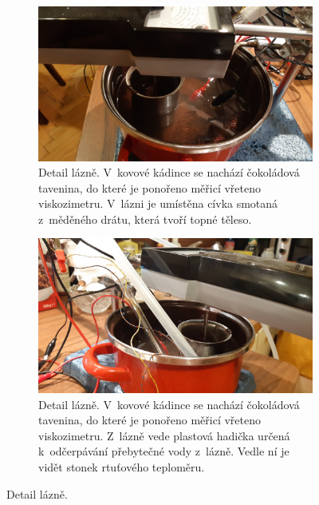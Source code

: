 \documentclass[12pt]{article}
\begin{document}
\begin{figure}[h!]
    \begin{subfigure}[b]{\textwidth}
        \includegraphics[width = \textwidth]{prilohy/lázeň_1.jpg}
        \caption{Detail lázně. V~kovové kádince se nachází čokoládová tavenina, do které je ponořeno měřicí vřeteno viskozimetru. V~lázni je umístěna cívka smotaná z~měděného drátu, která tvoří topné těleso.}
    \end{subfigure}
    \hfill
    \begin{subfigure}[b]{\textwidth}
        \includegraphics[width = \textwidth]{prilohy/lázeň_2.jpg}
        \caption{Detail lázně. V~kovové kádince se nachází čokoládová tavenina, do které je ponořeno měřicí vřeteno viskozimetru. Z~lázně vede plastová hadička určená k~odčerpávání přebytečné vody z~lázně. Vedle ní je vidět stonek rtuťového teploměru.}
    \end{subfigure}
    \caption{Detail lázně.}
    \label{fig:lazen}
\end{figure}
\end{document}
